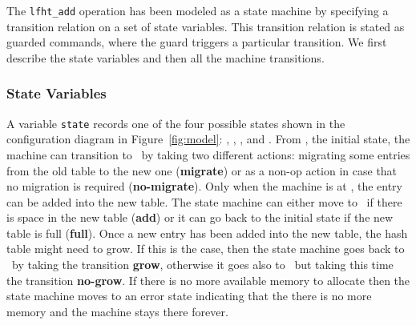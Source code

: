 The \texttt{lfht\_add} operation has been modeled as a state machine
by specifying a transition relation on a set of state variables. This
transition relation is stated as guarded commands, where the guard
triggers a particular transition.  We first describe the state
variables and then all the machine transitions.

\subsubsection{State Variables}

A variable \texttt{state} records one of the four possible states
shown in the configuration diagram in Figure~\ref{fig:model}:
\emph{\pczero}, \emph{\pcone}, \emph{\pctwo}, and \emph{\pcthree}.
%
From \pczero, the initial state, the machine can transition to
\pcone\ by taking two different actions: migrating some entries from
the old table to the new one (\textbf{migrate}) or as a non-op action
in case that no migration is required (\textbf{no-migrate}). Only when
the machine is at \pcone, the entry can be added into the new
table. The state machine can either move to \pctwo\ if there is space
in the new table (\textbf{add}) or it can go back to the initial state
if the new table is full (\textbf{full}). Once a new entry has been
added into the new table, the hash table might need to grow. If this
is the case, then the state machine goes back to \pczero\ by taking
the transition \textbf{grow}, otherwise it goes also to \pczero\ but
taking this time the transition \textbf{no-grow}. If there is no more
available memory to allocate then the state machine moves to an error
state indicating that the there is no more memory and the machine
stays there forever.

